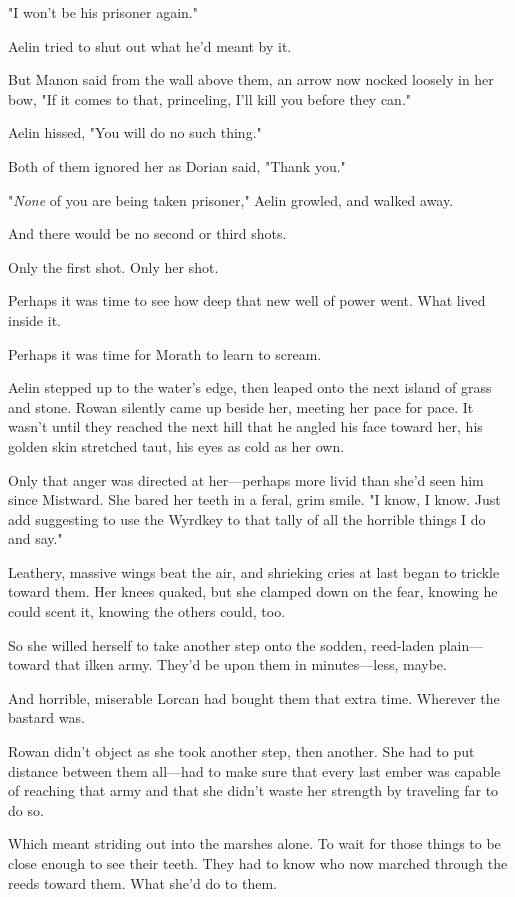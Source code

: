 "I won't be his prisoner again."

Aelin tried to shut out what he'd meant by it.

But Manon said from the wall above them, an arrow now nocked loosely in her bow, "If it comes to that, princeling, I'll kill you before they can."

Aelin hissed, "You will do no such thing."

Both of them ignored her as Dorian said, "Thank you."

"\emph{None} of you are being taken prisoner," Aelin growled, and walked away.

And there would be no second or third shots.

Only the first shot. Only her shot.

Perhaps it was time to see how deep that new well of power went. What lived inside it.

Perhaps it was time for Morath to learn to scream.

Aelin stepped up to the water's edge, then leaped onto the next island of grass and stone. Rowan silently came up beside her, meeting her pace for pace. It wasn't until they reached the next hill that he angled his face toward her, his golden skin stretched taut, his eyes as cold as her own.

Only that anger was directed at her---perhaps more livid than she'd seen him since Mistward. She bared her teeth in a feral, grim smile. "I know, I know. Just add suggesting to use the Wyrdkey to that tally of all the horrible things I do and say."

Leathery, massive wings beat the air, and shrieking cries at last began to trickle toward them. Her knees quaked, but she clamped down on the fear, knowing he could scent it, knowing the others could, too.

So she willed herself to take another step onto the sodden, reed-laden plain--- toward that ilken army. They'd be upon them in minutes---less, maybe.

And horrible, miserable Lorcan had bought them that extra time. Wherever the bastard was.

Rowan didn't object as she took another step, then another. She had to put distance between them all---had to make sure that every last ember was capable of reaching that army and that she didn't waste her strength by traveling far to do so.

Which meant striding out into the marshes alone. To wait for those things to be close enough to see their teeth. They had to know who now marched through the reeds toward them. What she'd do to them.

